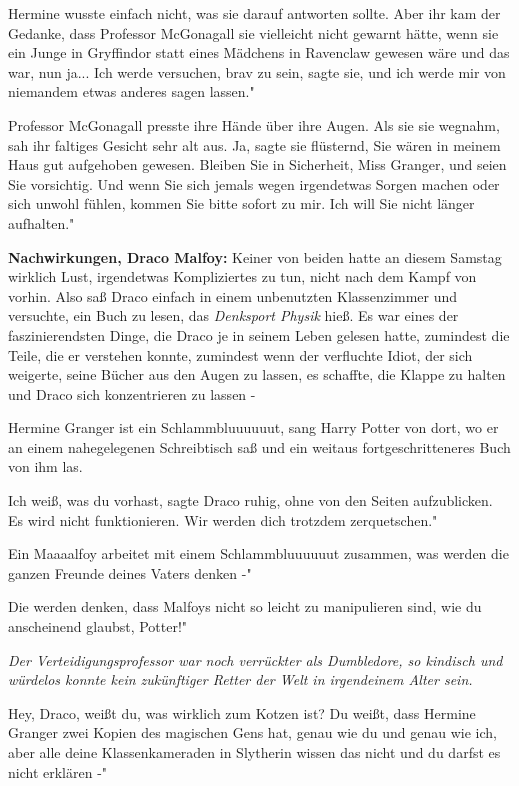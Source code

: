 Hermine wusste einfach nicht, was sie darauf antworten sollte. Aber ihr kam der
Gedanke, dass Professor McGonagall sie vielleicht nicht gewarnt hätte, wenn sie
ein Junge in Gryffindor statt eines Mädchens in Ravenclaw gewesen wäre und das
war, nun ja... \glqq Ich werde versuchen, brav zu sein\grqq{}, sagte sie, \glqq
und ich werde mir von niemandem etwas anderes sagen lassen."

Professor McGonagall presste ihre Hände über ihre Augen. Als sie sie wegnahm,
sah ihr faltiges Gesicht sehr alt aus. \glqq Ja\grqq{}, sagte sie flüsternd,
\glqq Sie wären in meinem Haus gut aufgehoben gewesen. Bleiben Sie in
Sicherheit, Miss Granger, und seien Sie vorsichtig. Und wenn Sie sich jemals
wegen irgendetwas Sorgen machen oder sich unwohl fühlen, kommen Sie bitte sofort
zu mir. Ich will Sie nicht länger aufhalten."


\textbf{Nachwirkungen, Draco Malfoy: }
Keiner von beiden hatte an diesem Samstag wirklich Lust, irgendetwas
Kompliziertes zu tun, nicht nach dem Kampf von vorhin. Also saß Draco einfach in
einem unbenutzten Klassenzimmer und versuchte, ein Buch zu lesen, das
\emph{\glqq Denksport Physik\grqq{} } hieß. Es war eines der faszinierendsten
Dinge, die Draco je in seinem Leben gelesen hatte, zumindest die Teile, die er
verstehen konnte, zumindest wenn der verfluchte Idiot, der sich weigerte, seine
Bücher aus den Augen zu lassen, es schaffte, die Klappe zu halten und Draco sich
konzentrieren zu lassen -

\glqq Hermine Granger ist ein Schlammbluuuuuut\grqq{}, sang Harry Potter von
dort, wo er an einem nahegelegenen Schreibtisch saß und ein weitaus
fortgeschritteneres Buch von ihm las.

\glqq Ich weiß, was du vorhast\grqq{}, sagte Draco ruhig, ohne von den Seiten
aufzublicken. \glqq Es wird nicht funktionieren. Wir werden dich trotzdem
zerquetschen."

\glqq Ein Maaaalfoy arbeitet mit einem Schlammbluuuuuut zusammen, was werden die
ganzen Freunde deines Vaters denken -"

\glqq Die werden denken, dass Malfoys nicht so leicht zu manipulieren sind, wie
du anscheinend glaubst, Potter!"

\emph{ Der Verteidigungsprofessor war noch verrückter als Dumbledore, so kindisch und würdelos konnte kein zukünftiger Retter der Welt in irgendeinem Alter sein.}

\glqq Hey, Draco, weißt du, was wirklich zum Kotzen ist? Du weißt, dass Hermine
Granger zwei Kopien des magischen Gens hat, genau wie du und genau wie ich, aber
alle deine Klassenkameraden in Slytherin wissen das nicht und du darfst es nicht
erklären -"

